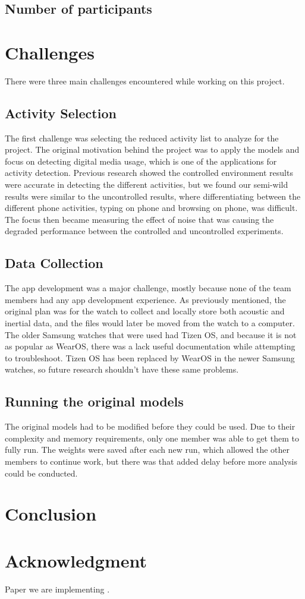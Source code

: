 \documentclass[conference]{IEEEtran}
\begin{document}
	\subsection{Number of participants}
	
	\section{Challenges}
	There were three main challenges encountered while working on this project. 
	\subsection{Activity Selection}
	The first challenge was selecting the reduced activity list to analyze for the project.
	The original motivation behind the project was to apply the models and focus on detecting digital media usage, which is one of the applications for activity detection. 
	Previous research showed the controlled environment results were accurate in detecting the different activities, but we found our semi-wild results were similar to the uncontrolled results, where differentiating between the different phone activities, typing on phone and browsing on phone, was difficult.
	The focus then became measuring the effect of noise that was causing the degraded performance between the controlled and uncontrolled experiments.
	
	
	\subsection{Data Collection}
	The app development was a major challenge, mostly because none of the team members had any app development experience.
	As previously mentioned, the original plan was for the watch to collect and locally store both acoustic and inertial data, and the files would later be moved from the watch to a computer.
	The older Samsung watches that were used had Tizen OS, and because it is not as popular as WearOS, there was a lack useful documentation while attempting to troubleshoot.
	Tizen OS has been replaced by WearOS in the newer Samsung watches, so future research shouldn't have these same problems.
	
	\subsection{Running the original models}
	The original models had to be modified before they could be used. 
	Due to their complexity and memory requirements, only one member was able to get them to fully run.
	The weights were saved after each new run, which allowed the other members to continue work, but there was that added delay before more analysis could be conducted.
	
	\section{Conclusion}
	
	
	\section*{Acknowledgment}
	
	Paper we are implementing \cite{2022_Leveraging_sound}.
	
	\nocite{*}
	\printbibliography
	
\end{document}
